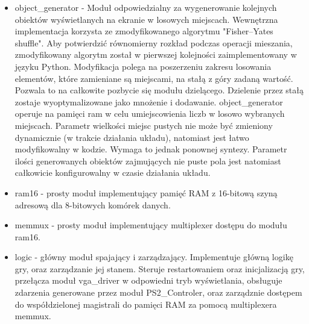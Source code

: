 \documentclass[polish,polish,a4paper]{article}
\begin{document}
\begin{itemize}
 \item
  object\_generator - Moduł odpowiedzialny za wygenerowanie kolejnych obiektów wyświetlanych na ekranie w losowych miejscach.
  Wewnętrzna implementacja korzysta ze zmodyfikowanego algorytmu "Fisher–Yates shuffle".
  Aby potwierdzić równomierny rozkład podczas operacji mieszania, zmodyfikowany algorytm został w pierwszej kolejności zaimplementowany w języku Python.
  Modyfikacja polega na poszerzeniu zakresu losowania elementów, które zamieniane są miejscami, na stałą z góry zadaną wartość.
  Pozwala to na całkowite pozbycie się modułu dzielącego.
  Dzielenie przez stałą zostaje wyoptymalizowane jako mnożenie i dodawanie.
  object\_generator operuje na pamięci ram w celu umiejscowienia liczb w losowo wybranych miejscach.
  Parametr wielkości miejsc pustych nie może być zmieniony dynamicznie (w trakcie działania układu), natomiast jest łatwo modyfikowalny w kodzie.
  Wymaga to jednak ponownej syntezy.
  Parametr ilości generowanych obiektów zajmujących nie puste pola jest natomiast całkowicie konfigurowalny w czasie działania układu.

 \item
   ram16 - prosty moduł implementujący pamięć RAM z 16-bitową szyną adresową dla 8-bitowych komórek danych.

 \item
   memmux - prosty moduł implementujący multiplexer dostępu do modułu ram16.

 \item
  logic - główny moduł spajający i zarządzający.
  Implementuje główną logikę gry, oraz zarządzanie jej stanem.
  Steruje restartowaniem oraz inicjalizacją gry, przełącza moduł vga\_driver w odpowiedni tryb wyświetlania, obsługuje zdarzenia generowane przez moduł 
  PS2\_Controler, oraz zarządznie dostępem do współdzielonej magistrali do pamięci RAM za pomocą multiplexera memmux.


\end{itemize}
\end{document}
